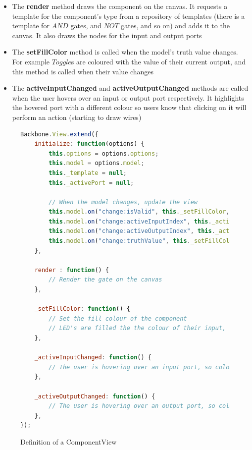 \begin{itemize}
	\item The \textbf{render} method draws the component on the canvas. It requests a template for the component's type from a repository of templates (there is a template for $AND$ gates, and $NOT$ gates, and so on) and adds it to the canvas. It also draws the nodes for the input and output ports
	\item The \textbf{setFillColor} method is called when the model's truth value changes. For example $Toggle$s are coloured with the value of their current output, and this method is called when their value changes
	\item The \textbf{activeInputChanged} and \textbf{activeOutputChanged} methods are called when the user hovers over an input or output port respectively. It highlights the hovered port with a different colour so users know that clicking on it will perform an action (starting to draw wires)
\end{itemize}

\begin{figure}
\begin{lstlisting}[language=JavaScript]
Backbone.View.extend({
    initialize: function(options) {
        this.options = options.options;
        this.model = options.model;
        this._template = null;
        this._activePort = null;
		
		// When the model changes, update the view
        this.model.on("change:isValid", this._setFillColor, this);
        this.model.on("change:activeInputIndex", this._activeInputChanged, this);
        this.model.on("change:activeOutputIndex", this._activeOutputChanged, this);
        this.model.on("change:truthValue", this._setFillColor, this);
    },

    render : function() {
        // Render the gate on the canvas
    },

    _setFillColor: function() {
        // Set the fill colour of the component
        // LED's are filled the the colour of their input, for example
    },

    _activeInputChanged: function() {
        // The user is hovering over an input port, so colour it red
    },

    _activeOutputChanged: function() {
        // The user is hovering over an output port, so colour it red
    },
});
\end{lstlisting}
\caption{Definition of a ComponentView}
\label{fig:componentview}
\end{figure}

